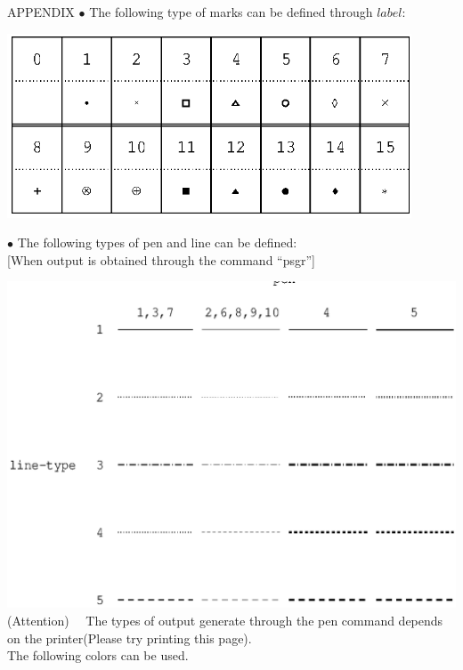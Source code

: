 \begin{qsection}{APPENDIX}
{\large \hspace{-1.5ex}$\bullet$
The following type of marks can be defined through $label$:}

\begin{center}
\leavevmode
\includegraphics[width=12cm]{fig/mark.eps} \\
\end{center}


{\large \hspace{-1.5ex}$\bullet$
The following types of pen and line can be defined:}\\
\hspace{3mm}[When output is obtained through the command ``psgr'']

\leavevmode
\includegraphics{fig/pen-line.eps} \\

(Attention)~~ The types of output generate through the pen command
depends on the printer(Please try printing this page).
\\
The following colors can be used.\\


\end{qsection}
